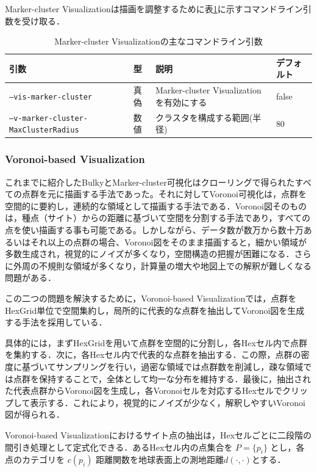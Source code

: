 Marker-cluster Visualizationは描画を調整するために表\ref{tab:marker_cluster_params}に示すコマンドライン引数を受け取る．
\begin{table}[h]
\centering\small
\caption{Marker-cluster Visualizationの主なコマンドライン引数}
\label{tab:marker_cluster_params} 
\begin{tabular}{llll}
\hline
引数 & 型 & 説明 & デフォルト \\ 
\hline
	\texttt{--vis-marker-cluster} & 真偽 & Marker-cluster Visualizationを有効にする & false \\
	\texttt{--v-marker-cluster-MaxClusterRadius} & 数値 & クラスタを構成する範囲(半径) & 80 \\
\hline
\end{tabular}
\end{table} 

\subsubsection{Voronoi-based Visualization}

これまでに紹介したBulkyとMarker-cluster可視化はクローリングで得られたすべての点群を元に描画する手法であった。それに対してVoronoi可視化は，点群を空間的に要約し，連続的な領域として描画する手法である．Voronoi図そのものは，種点（サイト）からの距離に基づいて空間を分割する手法であり，すべての点を使い描画する事も可能である。しかしながら、データ数が数万から数十万あるいはそれ以上の点群の場合、Voronoi図をそのまま描画すると，細かい領域が多数生成され，視覚的にノイズが多くなり，空間構造の把握が困難になる．さらに外周の不規則な領域が多くなり，計算量の増大や地図上での解釈が難しくなる問題がある．

この二つの問題を解決するために，Voronoi-based Visualizationでは，点群をHexGrid単位で空間集約し，局所的に代表的な点群を抽出してVoronoi図を生成する手法を採用している．

具体的には，まずHexGridを用いて点群を空間的に分割し，各Hexセル内で点群を集約する．次に，各Hexセル内で代表的な点群を抽出する．この際，点群の密度に基づいてサンプリングを行い，過密な領域では点群数を削減し，疎な領域では点群を保持することで，全体として均一な分布を維持する．最後に，抽出された代表点群からVoronoi図を生成し，各Voronoiセルを対応するHexセルでクリップして表示する．これにより，視覚的にノイズが少なく，解釈しやすいVoronoi図が得られる．

Voronoi-based Visualizationにおけるサイト点の抽出は，Hexセルごとに二段階の間引き処理として定式化できる．あるHexセル内の点集合を $P = \{p_i\}$ とし，各点のカテゴリを $c(p_i)$ 距離関数を地球表面上の測地距離$d(\cdot,\cdot)$とする．

